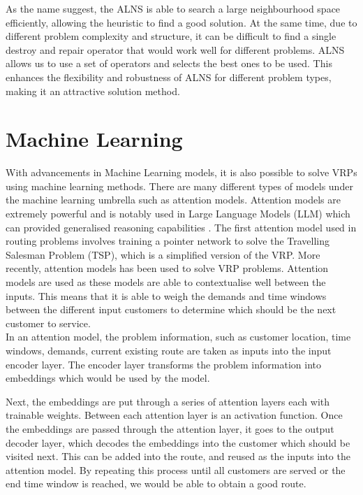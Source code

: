As the name suggest, the ALNS is able to search a large neighbourhood space efficiently, allowing the heuristic to find a good solution. At the same time, due to different problem complexity and structure, it can be difficult to find a single destroy and repair operator that would work well for different problems. ALNS allows us to use a set of operators and selects the best ones to be used. This enhances the flexibility and robustness of ALNS for different problem types, making it an attractive solution method.


\section{Machine Learning}
With advancements in Machine Learning models, it is also possible to solve VRPs using machine learning methods. There are many different types of models under the machine learning umbrella such as attention models. Attention models are extremely powerful and is notably used in Large Language Models (LLM) which can provided generalised reasoning capabilities \cite{vaswani_attention_2023}. The first attention model used in routing problems involves training a pointer network \cite{vinyals_pointer_2017} to solve the Travelling Salesman Problem (TSP), which is a simplified version of the VRP. More recently, attention models \cite{kool_attention_2019} has been used to solve VRP problems. Attention models are used as these models are able to contextualise well between the inputs. This means that it is able to weigh the demands and time windows between the different input customers to determine which should be the next customer to service. \\

In an attention model, the problem information, such as customer location, time windows, demands, current existing route are taken as inputs into the input encoder layer. The encoder layer transforms the problem information into embeddings which would be used by the model.

Next, the embeddings are put through a series of attention layers each with trainable weights. Between each attention layer is an activation function. Once the embeddings are passed through the attention layer, it goes to the output decoder layer, which decodes the embeddings into the customer which should be visited next. This can be added into the route, and reused as the inputs into the attention model. By repeating this process until all customers are served or the end time window is reached, we would be able to obtain a good route.

